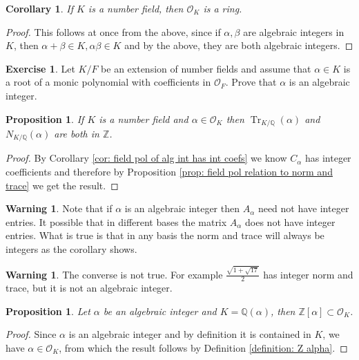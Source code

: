 \documentclass[11pt,a4paper]{report}
\theoremstyle{plain}
\newtheorem{cor}[subsection]{Corollary}
\newtheorem{prop}[subsection]{Proposition}
\theoremstyle{definition}
\theoremstyle{definition}
\newtheorem{warn}[subsection]{Warning}
\newtheorem{question}[subsection]{Exercise}
\newcommand{\Tr}{\operatorname{Tr}}
\newcommand{\ZZ}{\mathbb{Z}}
\def\QQ{\mathbb{Q}}
\def \a{\alpha}
\def \OO {\mathcal{O}}
\begin{document}
	\begin{cor}
		If $K$ is a number field, then $\OO_K$ is a ring.
	\end{cor}
	
	\begin{proof}
		This follows at once from the above, since if $\a,\beta$ are algebraic integers in $K$, then $\a+\beta \in K, \a \beta \in K$ and by the above, they are both algebraic integers.
	\end{proof}
	
	\begin{question}\label{quest: ints in tower law}
		Let $K/F$ be an extension of number fields and assume that $\a \in K$ is a root of a monic polynomial with coefficients in $\OO_F$. Prove that $\a$ is an algebraic integer.
	\end{question}
	
	\begin{prop}\label{prop: norm trace of alg int is int}
		If $K$ is a number field and $\a \in \OO_K$ then $\Tr_{K/\QQ}(\a)$ and $N_{K/\QQ}(\a)$ are both in $\ZZ$. 
	\end{prop}
	
	\begin{proof}
		By Corollary \ref{cor: field pol of alg int has int coefs} we know $C_\a$ has integer coefficients and therefore by Proposition \ref{prop: field pol relation to norm and trace} we get the result.
		
		
	\end{proof}
	
	
	\begin{warn}
		Note  that if $\a$ is an algebraic integer then $A_\a$ need not have  integer entries. It possible that in different bases the matrix $A_\a$ does not have integer entries. What is true is that in any basis the norm and trace will always be integers as the corollary shows.
	\end{warn}
	
	
	\begin{warn}
		The converse is not true. For example $\frac{\sqrt{1+\sqrt{17}}}{2}$ has integer norm and trace, but it is not an algebraic integer. 
	\end{warn}
	
	
	
	
	\begin{prop}
		Let $\a$ be an algebraic integer and $K=\QQ(\a)$, then $\ZZ[\a] \subset \OO_K$.
	\end{prop}
	
	\begin{proof}
		Since $\a$ is an algebraic integer and by definition it is contained in $K$, we have $\a \in \OO_K$, from which the result follows by Definition \ref{definition: Z alpha}.
	\end{proof}
	
\end{document}
